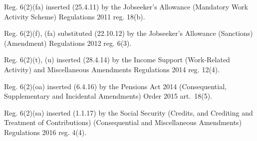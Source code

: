 \documentclass[12pt,a4paper]{article}
\begin{document}
{Reg. 6(2)(fa) inserted (25.4.11) by the Jobseeker’s Allowance (Mandatory Work Activity Scheme) Regulations 2011 reg. 18(b).

Reg. 6(2)(f), (fa) substituted (22.10.12) by the Jobseeker’s Allowance (Sanctions) (Amendment) Regulations 2012 reg. 6(3).

Reg. 6(2)(t), (u) inserted (28.4.14) by the Income Support (Work-Related Activity) and Miscellaneous Amendments Regulations 2014 reg. 12(4).

Reg. 6(2)(oa) inserted (6.4.16) by the Pensions Act 2014 (Consequential, Supplementary and Incidental Amendments) Order 2015 art.~18(5).

Reg. 6(2)(sa) inserted (1.1.17) by the Social Security (Credits, and Crediting and Treatment of Contributions) (Consequential and Miscellaneous Amendments) Regulations 2016 reg. 4(4).
}
\end{document}
